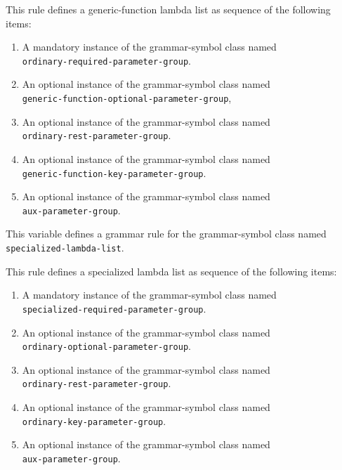 This rule defines a generic-function lambda list as sequence of the
following items:

\begin{enumerate}
\item A mandatory instance of the grammar-symbol class named\\
  \texttt{ordinary-required-parameter-group}.
\item An optional instance of the grammar-symbol class named\\
\texttt{generic-function-optional-parameter-group},
\item An optional instance of the grammar-symbol class named\\
\texttt{ordinary-rest-parameter-group}.
\item An optional instance of the grammar-symbol class named\\
\texttt{generic-function-key-parameter-group}.
\item An optional instance of the grammar-symbol class named\\
\texttt{aux-parameter-group}.
\end{enumerate}


This variable defines a grammar rule for the grammar-symbol class
named \texttt{specialized-lambda-list}.

This rule defines a specialized lambda list as sequence of the
following items:

\begin{enumerate}
\item A mandatory instance of the grammar-symbol class named\\
  \texttt{specialized-required-parameter-group}.
\item An optional instance of the grammar-symbol class named\\
  \texttt{ordinary-optional-parameter-group}.
\item An optional instance of the grammar-symbol class named\\
\texttt{ordinary-rest-parameter-group}.
\item An optional instance of the grammar-symbol class named\\
\texttt{ordinary-key-parameter-group}.
\item An optional instance of the grammar-symbol class named\\
\texttt{aux-parameter-group}.
\end{enumerate}

